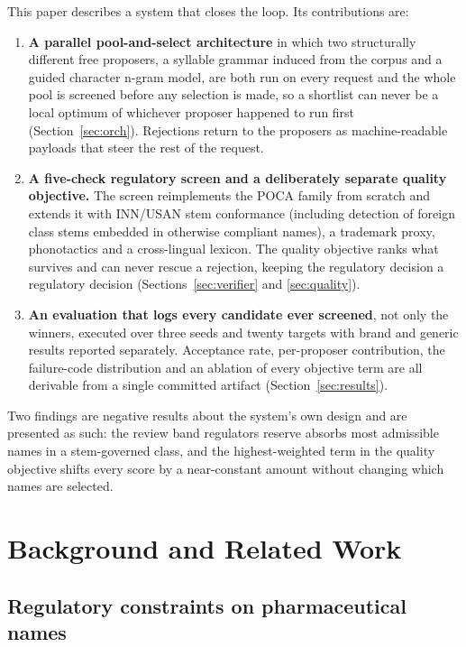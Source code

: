 \documentclass[conference]{IEEEtran}
\begin{document}
This paper describes a system that closes the loop. Its contributions are:

\begin{enumerate}
\item \textbf{A parallel pool-and-select architecture} in which two structurally
      different free proposers, a syllable grammar induced from the corpus and a
      guided character n-gram model, are both run on every request and the whole
      pool is screened before any selection is made, so a shortlist can never be
      a local optimum of whichever proposer happened to run first
      (Section~\ref{sec:orch}). Rejections return to the proposers as
      machine-readable payloads that steer the rest of the request.
\item \textbf{A five-check regulatory screen and a deliberately separate quality
      objective.} The screen reimplements the POCA family from scratch and
      extends it with INN/USAN stem conformance (including detection of foreign
      class stems embedded in otherwise compliant names), a trademark proxy,
      phonotactics and a cross-lingual lexicon. The quality objective ranks what
      survives and can never rescue a rejection, keeping the regulatory decision
      a regulatory decision (Sections~\ref{sec:verifier} and \ref{sec:quality}).
\item \textbf{An evaluation that logs every candidate ever screened}, not only
      the winners, executed over three seeds and twenty targets with brand and
      generic results reported separately. Acceptance rate, per-proposer
      contribution, the failure-code distribution and an ablation of every
      objective term are all derivable from a single committed artifact
      (Section~\ref{sec:results}).
\end{enumerate}

Two findings are negative results about the system's own design and are
presented as such: the review band regulators reserve absorbs most admissible
names in a stem-governed class, and the highest-weighted term in the quality
objective shifts every score by a near-constant amount without changing which
names are selected.

\section{Background and Related Work}

\subsection{Regulatory constraints on pharmaceutical names}
\end{document}
